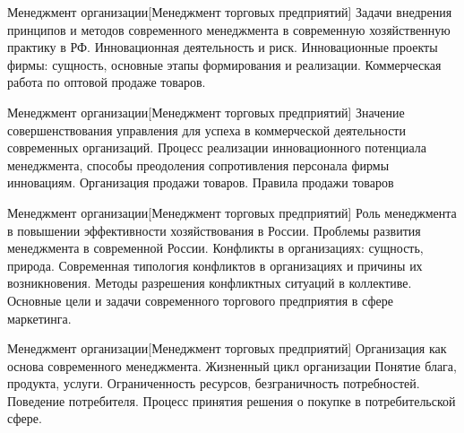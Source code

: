 \documentclass[
	11pt,
	a4paper,
	]
	{article}
\begin{document}
	

\begin{minipage}[t][\miniH]{\miniL}\centering
	 {Менеджмент организации}[Менеджмент торговых предприятий]
		{
			Задачи внедрения принципов и методов современного менеджмента в современную хозяйственную практику в РФ.
		}{
			Инновационная деятельность и риск. Инновационные проекты фирмы: сущность, основные этапы формирования и реализации.
		}{
			Коммерческая работа по оптовой продаже товаров.
		}
	\lowGE
\end{minipage}

\vfill



\begin{minipage}[t][\miniH]{\miniL}\centering
	 {Менеджмент организации}[Менеджмент торговых предприятий]
		{
			Значение совершенствования управления для успеха в коммерческой деятельности современных организаций.
		}{
			Процесс реализации инновационного потенциала менеджмента, способы преодоления сопротивления персонала фирмы инновациям.
		}{
			Организация продажи товаров. Правила продажи товаров
		}
	\lowGE
\end{minipage}

\vfill



\begin{minipage}[t][\miniH]{\miniL}\centering
	 {Менеджмент организации}[Менеджмент торговых предприятий]
		{
			Роль менеджмента в повышении эффективности хозяйствования в России. Проблемы развития менеджмента в современной России.
		}{
			Конфликты в организациях: сущность, природа. Современная типология конфликтов в организациях и причины их возникновения. Методы разрешения конфликтных ситуаций в коллективе.
		}{
			Основные цели и задачи современного торгового предприятия в сфере маркетинга.
		}
	\lowGE
\end{minipage}





\begin{minipage}[t][\miniH]{\miniL}\centering
	 {Менеджмент организации}[Менеджмент торговых предприятий]
		{
			Организация как основа современного менеджмента. Жизненный цикл организации
		}{
			Понятие блага, продукта, услуги. Ограниченность ресурсов, безграничность потребностей.
		}{
			Поведение потребителя. Процесс принятия решения о покупке в потребительской сфере.
		}
	\lowGE
\end{minipage}
\end{document}
